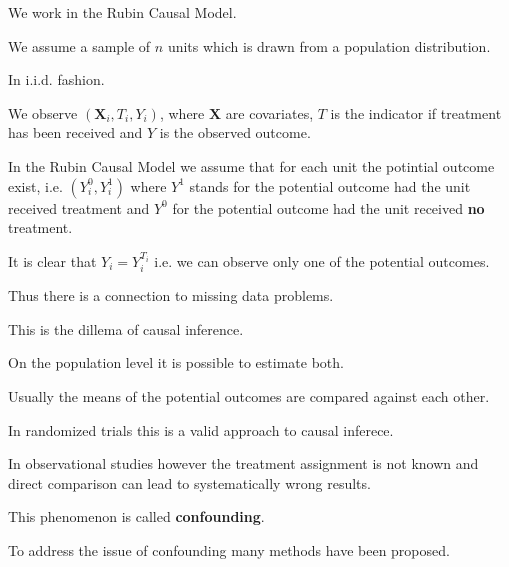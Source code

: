 We work in the Rubin Causal Model.

We assume a sample of $n$ units which is drawn from a population distribution.

In i.i.d. fashion.

We observe $ (\mathbf{X}_i, T_i, Y_i) $,
where $\mathbf{X}$ are covariates, 
$T$ is the indicator if treatment has been received
and $Y$ is the observed outcome.

In the Rubin Causal Model we assume that for each unit the potintial outcome exist, i.e. $(Y_i^0, Y_i^1)$ where $Y^1$ stands for the potential outcome had the unit received treatment and $Y^0$ for the potential outcome had the unit received \textbf{no} treatment.

It is clear that $Y_i = Y_i^{T_i}$ i.e. we can observe only one of the potential outcomes.

Thus there is a connection to missing data problems.

This is the dillema of causal inference.
 
On the population level it is possible to estimate both.

Usually the means of the potential outcomes are compared against each other.

In randomized trials this is a valid approach to causal inferece.

In observational studies however the treatment assignment is not known and direct comparison can lead to systematically wrong results.

This phenomenon is called \textbf{confounding}.
 
To address the issue of confounding many methods have been proposed.
